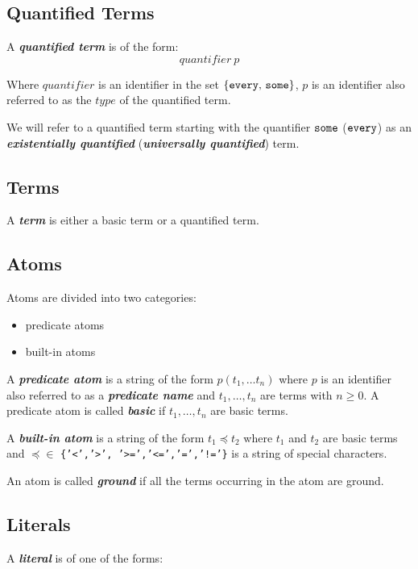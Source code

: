 \documentclass[a4paper,10pt]{article}
\begin{document}
\subsection{Quantified Terms}


A \textit{\textbf{quantified term}} is of the form:
 $$ quantifier~p $$



Where $quantifier$ is an identifier in the set $\{\mbox{\texttt{every}, \texttt{some}}\}$, $p$ is an identifier also referred to as the $type$ of the quantified term.

We will refer to a quantified term starting with the quantifier $\mbox{\texttt{some}}$ ($\mbox{\texttt{every}}$) as an \textbf{\textit{existentially quantified}} (\textbf{\textit{universally quantified}}) term.  


\subsection{Terms}
A \textit{\textbf{term}} is either a basic term or a quantified term.
\subsection{Atoms}

Atoms are divided into two categories:
\begin{itemize}
\item predicate atoms
\item built-in atoms
\end{itemize}

A \textit{\textbf{predicate atom}} is a string of the form $p(t_1,\ldots t_n)$ where 
$p$ is an identifier also referred to as a \textbf{\textit{predicate name}} and $t_1,\ldots,t_n$ are terms with $n \geq 0$.
A predicate atom is called \textbf{\textit{basic}} if $t_1,\ldots,t_n$ are basic terms.

A \textit{\textbf{built-in atom}} is a string of the form $t_1 \preceq t_2$ where $t_1$ and $t_2$ are basic terms and $\preceq \in$ \texttt{\{'<','>', '>=','<=','=','!='\}} is a string of special characters.

An atom is called \textbf{\textit{ground}} if all the terms occurring in the atom are ground.

\subsection{Literals}

A \textit{\textbf{literal}} is of one of the forms:
\end{document}
